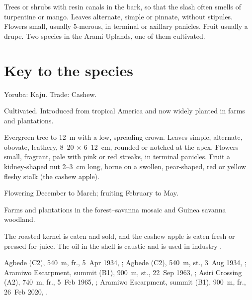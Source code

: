 \label{fam:anacardiaceae}

Trees or shrubs with resin canals in the bark, so that the slash often
smells of turpentine or mango. Leaves alternate, simple or pinnate,
without stipules. Flowers small, usually 5-merous, in terminal or
axillary panicles. Fruit usually a drupe. Two species in the Arami
Uplands, one of them cultivated.

\section*{Key to the species}
\begin{florakey}
\end{florakey}

\label{sp:ANA01}

 Yoruba: Kaju. Trade: Cashew.

 Cultivated. Introduced from tropical America and now
widely planted in farms and plantations.

 Evergreen tree to 12~m with a low, spreading
crown. Leaves simple, alternate, obovate, leathery, 8--20
$\times$ 6--12~cm, rounded or notched at the apex. Flowers small,
fragrant, pale with pink or red streaks, in terminal panicles. Fruit a
kidney-shaped nut 2--3~cm long, borne on a swollen, pear-shaped, red
or yellow fleshy stalk (the cashew apple).

 Flowering December to March; fruiting February to
May.

 Farms and plantations in the forest--savanna mosaic
and Guinea savanna woodland.

 The roasted kernel is eaten and sold, and the cashew
apple is eaten fresh or pressed for juice. The oil in the shell is
caustic and is used in industry \citep{burkill1985,orwa2009}.

 Agbede (C2), 540~m, fr., 5~Apr 1934, ;
Agbede (C2), 540~m, st., 3~Aug 1934, ;
Aramiwo Escarpment, summit (B1), 900~m, st., 22~Sep 1963, ;
Asiri Crossing (A2), 740~m, fr., 5~Feb 1965, ;
Aramiwo Escarpment, summit (B1), 900~m, fr., 26~Feb 2020, .

